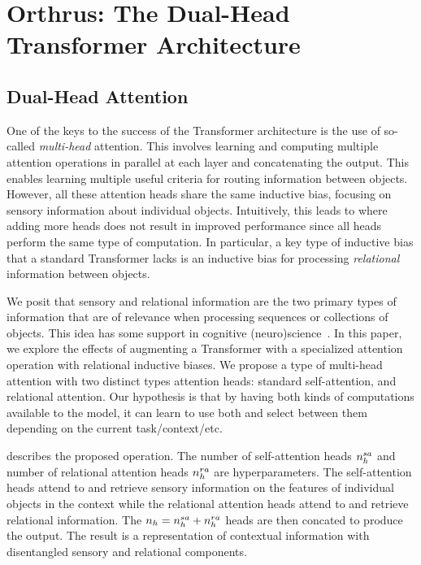 \section{Orthrus: The Dual-Head Transformer Architecture}

\subsection{Dual-Head Attention}

One of the keys to the success of the Transformer architecture is the use of so-called \textit{multi-head} attention. This involves learning and computing multiple attention operations in parallel at each layer and concatenating the output. This enables learning multiple useful criteria for routing information between objects. However, all these attention heads share the same inductive bias, focusing on sensory information about individual objects. Intuitively, this leads to  where adding more heads does not result in improved performance since all heads perform the same type of computation. In particular, a key type of inductive bias that a standard Transformer lacks is an inductive bias for processing \textit{relational} information between objects.

We posit that sensory and relational information are the two primary types of information that are of relevance when processing sequences or collections of objects. This idea has some support  in cognitive (neuro)science~\citep{citation}. In this paper, we explore the effects of augmenting a Transformer with a specialized attention operation with relational inductive biases. We propose a type of multi-head attention with two distinct types attention heads: standard self-attention, and relational attention. Our hypothesis is that by having both kinds of computations available to the model, it can learn to use both and select between them depending on the current task/context/etc.

 describes the proposed operation. The number of self-attention heads $n_h^{sa}$ and number of relational attention heads $n_h^{ra}$ are hyperparameters. The self-attention heads attend to and retrieve sensory information on the features of individual objects in the context while the relational attention heads attend to and retrieve relational information. The $n_h = n_h^{sa} + n_h^{ra}$ heads are then concated to produce the output. The result is a representation of contextual information with disentangled sensory and relational components.

